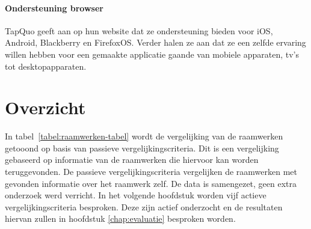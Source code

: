 \paragraph{Ondersteuning browser}
TapQuo geeft aan op hun website dat ze ondersteuning bieden voor iOS, Android, Blackberry en FirefoxOS.
Verder halen ze aan dat ze een zelfde ervaring willen hebben voor een gemaakte applicatie gaande van mobiele apparaten, tv's tot desktopapparaten.


\section{Overzicht}
\label{sec:raamwerken-tabel}

In tabel~\ref{tabel:raamwerken-tabel} wordt de vergelijking van de raamwerken getooond op basis van passieve vergelijkingscriteria.
Dit is een vergelijking gebaseerd op informatie van de raamwerken die hiervoor kan worden teruggevonden.
De passieve vergelijkingscriteria vergelijken de raamwerken met gevonden informatie over het raamwerk zelf.
De data is samengezet,  geen extra onderzoek werd verricht.
In het volgende hoofdstuk worden vijf actieve vergelijkingscriteria besproken.
Deze zijn actief onderzocht en de resultaten hiervan zullen in hoofdstuk \ref{chap:evaluatie} besproken worden.

\begin{landscape}
\begin{table}[H]
\centering
{}
\caption{Samenvattende tabel voor passieve vergelijkingscriteria van mobiele HTML5-raamwerken}
\label{tabel:raamwerken-tabel}
\end{table}
\end{landscape}

